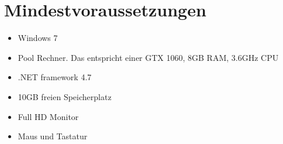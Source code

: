 \section{Mindestvoraussetzungen}

%
%


\begin{itemize}[leftmargin=*, nosep]
    \item Windows 7
    \item Pool Rechner. Das entspricht einer GTX 1060, 8GB RAM, 3.6GHz CPU 
    \item .NET framework 4.7
    \item 10GB freien Speicherplatz
    \item Full HD Monitor
    \item Maus und Tastatur
\end{itemize}
